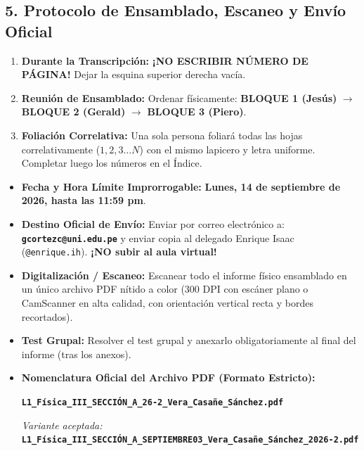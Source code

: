 \documentclass[a4paper, 10pt]{article}
\begin{document}
\newpage

\subsection*{\color{uni-blue}5. Protocolo de Ensamblado, Escaneo y Envío Oficial}

\begin{tcolorbox}[title=Regla de Paginación y Ensamblado Físico, colframe=uni-blue]
    \footnotesize
    \begin{enumerate}[leftmargin=1.5em, itemsep=2pt]
        \item \textbf{Durante la Transcripción:} \textbf{¡NO ESCRIBIR NÚMERO DE PÁGINA!} Dejar la esquina superior derecha vacía.
        \item \textbf{Reunión de Ensamblado:} Ordenar físicamente: \textbf{BLOQUE 1 (Jesús)} $\longrightarrow$ \textbf{BLOQUE 2 (Gerald)} $\longrightarrow$ \textbf{BLOQUE 3 (Piero)}.
        \item \textbf{Foliación Correlativa:} Una sola persona foliará todas las hojas correlativamente ($1, 2, 3\dots N$) con el mismo lapicero y letra uniforme. Completar luego los números en el Índice.
    \end{enumerate}
\end{tcolorbox}

\vspace{0.05cm}

\begin{tcolorbox}[title=Indicaciones Oficiales del Docente y Formato de Envío, colframe=uni-red]
    \footnotesize
    \begin{itemize}[leftmargin=1.5em, itemsep=2.5pt]
        \item \textbf{Fecha y Hora Límite Improrrogable:} \textbf{Lunes, 14 de septiembre de 2026, hasta las 11:59 pm}.
        \item \textbf{Destino Oficial de Envío:} Enviar por correo electrónico a: \texttt{\textbf{gcortezc@uni.edu.pe}} y enviar copia al delegado Enrique Isaac (\texttt{@enrique.ih}). \textbf{¡NO subir al aula virtual!}
        \item \textbf{Digitalización / Escaneo:} Escanear todo el informe físico ensamblado en un único archivo PDF nítido a color (300 DPI con escáner plano o CamScanner en alta calidad, con orientación vertical recta y bordes recortados).
        \item \textbf{Test Grupal:} Resolver el test grupal y anexarlo obligatoriamente al final del informe (tras los anexos).
        \item \textbf{Nomenclatura Oficial del Archivo PDF (Formato Estricto):}
        \begin{center}
            \texttt{\textbf{L1\_Física\_III\_SECCIÓN\_A\_26-2\_Vera\_Casañe\_Sánchez.pdf}}
        \end{center}
        \textit{Variante aceptada:} \texttt{\textbf{L1\_Física\_III\_SECCIÓN\_A\_SEPTIEMBRE03\_Vera\_Casañe\_Sánchez\_2026-2.pdf}}
    \end{itemize}
\end{tcolorbox}
\end{document}
